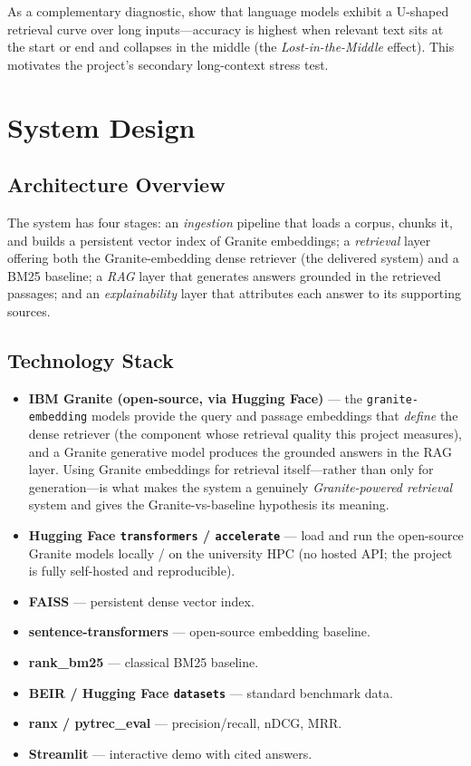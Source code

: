 As a complementary diagnostic, \textcite{liu2024lost} show that language models
exhibit a U-shaped retrieval curve over long inputs---accuracy is highest when
relevant text sits at the start or end and collapses in the middle (the
\emph{Lost-in-the-Middle} effect). This motivates the project's secondary
long-context stress test.

\section{System Design}

\subsection{Architecture Overview}

The system has four stages: an \emph{ingestion} pipeline that loads a corpus,
chunks it, and builds a persistent vector index of Granite embeddings; a
\emph{retrieval} layer offering both the Granite-embedding dense retriever (the
delivered system) and a BM25 baseline; a
\emph{RAG} layer that generates answers grounded in the retrieved passages; and
an \emph{explainability} layer that attributes each answer to its supporting
sources.

\subsection{Technology Stack}

\begin{itemize}
  \item \textbf{IBM Granite (open-source, via Hugging Face)} --- the
        \texttt{granite-embedding} models provide the query and passage
        embeddings that \emph{define} the
        dense retriever (the component whose retrieval quality this project
        measures), and a Granite generative model produces the grounded answers
        in the RAG layer. Using Granite embeddings for retrieval itself---rather
        than only for generation---is what makes the system a genuinely
        \emph{Granite-powered retrieval} system and gives the
        Granite-vs-baseline hypothesis its meaning.
  \item \textbf{Hugging Face \texttt{transformers} / \texttt{accelerate}} ---
        load and run the open-source Granite models locally / on the university
        HPC (no hosted API; the project is fully self-hosted and reproducible).
  \item \textbf{FAISS} --- persistent dense vector index.
  \item \textbf{sentence-transformers} --- open-source embedding baseline.
  \item \textbf{rank\_bm25} --- classical BM25 baseline.
  \item \textbf{BEIR / Hugging Face \texttt{datasets}} --- standard benchmark data.
  \item \textbf{ranx / pytrec\_eval} --- precision/recall, nDCG, MRR.
  \item \textbf{Streamlit} --- interactive demo with cited answers.
\end{itemize}

